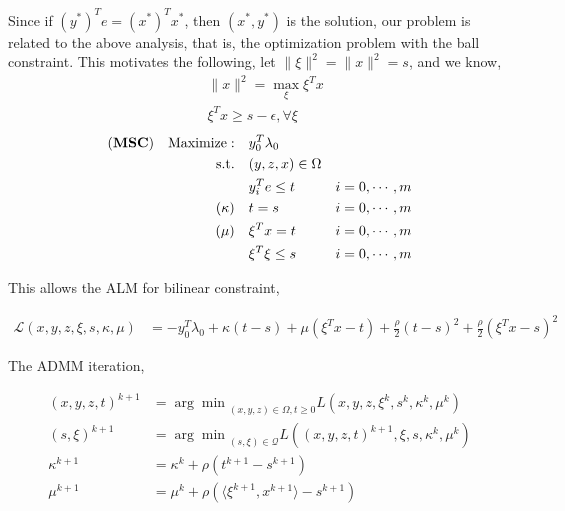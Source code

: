 \documentclass[../main]{subfiles}
\begin{document}
Since if \((y^*)^Te = (x^*)^Tx^*\), then \((x^*, y^*)\) is the solution, our problem is related to the above analysis, that is, the optimization problem with the ball constraint.
This motivates the following, let \(\|\xi\|^2 = \|x\|^2 = s\), and we know,
\begin{align}
     & \|x\|^2 = \max_\xi \xi^T x           \\
     & \xi^Tx \ge s - \epsilon, \forall \xi
\end{align}
\begin{align}
    (\textbf{MSC}) \quad \mathrm{Maximize: }\quad & y_0 ^T\lambda_0                     \\
    \mathrm{s.t.} \quad                        & (y,z,x) \in \Omega                  \\
                                               & y_i^Te \le t       & i=0, \cdots, m \\
    (\kappa) \quad                             & t= s               & i=0, \cdots, m \\
    (\mu)    \quad                             & \xi^Tx = t         & i=0, \cdots, m \\
                                               & \xi^T\xi \le s     & i=0, \cdots, m
\end{align}

This allows the ALM for bilinear constraint,

\begin{align*}
    \mathscr L\left(x,y,z,\xi,s,\kappa,\mu\right) & = - y_0 ^T\lambda_0 + \kappa(t-s) + \mu(\xi^Tx - t) + \frac{\rho}{2}(t-s)^2 + \frac{\rho}{2}(\xi^Tx - s)^2
\end{align*}

The ADMM iteration,

\begin{align*}
    (x,y,z,t)^{k+1} & = {\arg\min}_{(x,y,z)\in\Omega, t\ge 0} L\left(x,y,z,\xi^k,s^k,\kappa^k,\mu^k\right)       \\
    (s, \xi)^{k+1}  & = {\arg\min}_{(s, \xi)\in\mathscr{Q}} L\left((x,y,z,t)^{k+1},\xi,s, \kappa^k, \mu^k\right) \\
    \kappa^{k+1}    & = \kappa^k + \rho\left(t^{k+1}-s^{k+1}\right)                                              \\
    \mu^{k+1}       & = \mu^k + \rho\left( \langle\xi^{k+1}, x^{k+1}\rangle - s^{k+1}\right)                     \\
\end{align*}
\end{document}
